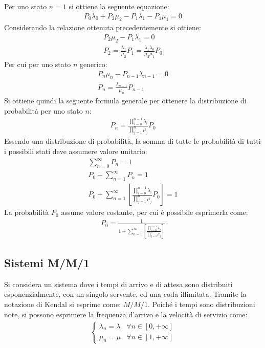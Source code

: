 \documentclass{article}
\numberwithin{equation}{subsection}
\begin{document}
Per uno stato $n=1$ si ottiene la seguente equazione:
\begin{gather*}
    P_0\lambda_0+P_2\mu_2-P_1\lambda_1-P_1\mu_1=0
\end{gather*}
Considerando la relazione ottenuta precedentemente si ottiene:
\begin{gather*}
    P_2\mu_2-P_1\lambda_1=0\\
    P_2=\displaystyle\frac{\lambda_1}{\mu_2}P_1=\frac{\lambda_1\lambda_0}{\mu_2\mu_1}P_0
\end{gather*}
Per cui per uno stato $n$ generico:
\begin{gather*}
    P_n\mu_n-P_{n-1}\lambda_{n-1}=0\\
    P_n=\displaystyle\frac{\lambda_{n-1}}{\mu_{n}}P_{n-1}
\end{gather*}
Si ottiene quindi la seguente formula generale per ottenere la distribuzione di probabilità per uno stato $n$:
\begin{gather}
    P_n=\displaystyle\frac{\displaystyle\prod_{i=0}^{n-1}\lambda_i}{\displaystyle\prod_{j=1}^n\mu_j}P_0
\end{gather}
Essendo una distribuzione di probabilità, la somma di tutte le probabilità di tutti i possibili stati deve assumere valore unitario:
\begin{gather*}
    \displaystyle\sum_{n=0}^{\infty}P_n=1\\
    P_0+\displaystyle\sum_{n=1}^{\infty}P_n=1\\
    P_0+\displaystyle\sum_{n=1}^{\infty}\left[\frac{\displaystyle\prod_{i=0}^{n-1}\lambda_i}{\displaystyle\prod_{j=1}^n\mu_j}P_0\right]=1
\end{gather*}
La probabilità $P_0$ assume valore costante, per cui è possibile esprimerla come:
\begin{gather}
    P_0=\displaystyle\frac{1}{1+\displaystyle\sum_{n=1}^{\infty}\left[\frac{\displaystyle\prod_{i=0}^{n-1}\lambda_i}{\displaystyle\prod_{j=1}^n\mu_j}\right]}
\end{gather}

\subsection{Sistemi M/M/1}

Si considera un sistema dove i tempi di arrivo e di attesa sono distribuiti esponenzialmente, con un singolo servente, ed una coda illimitata. Tramite la notazione di Kendal 
si esprime come: $M/M/1$. Poiché i tempi sono distribuzioni note, si possono esprimere la frequenza d'arrivo e la velocità di servizio come:
\begin{gather*}
    \begin{cases}
        \lambda_n=\lambda &\forall n\in[0,+\infty]\\
        \mu_n=\mu&\forall n\in[1,+\infty]        
    \end{cases}
\end{gather*}
\end{document}
